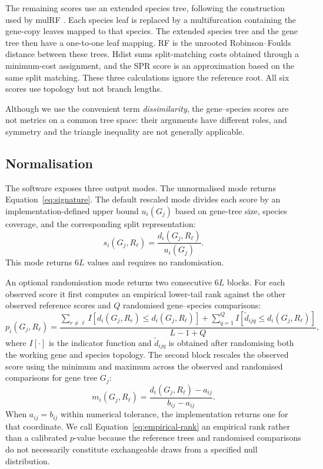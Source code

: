 The remaining scores use an extended species tree, following the construction used by mulRF
\citep{Chaudhary2015MulRF}. Each species leaf is replaced by a multifurcation containing the gene-copy leaves mapped to
that species. The extended species tree and the gene tree then have a one-to-one leaf mapping. RF is the unrooted
Robinson--Foulds distance between these trees. Hdist sums split-matching costs obtained through a minimum-cost assignment,
and the SPR score is an approximation based on the same split matching. These three calculations ignore the reference
root. All six scores use topology but not branch lengths.

Although we use the convenient term \emph{dissimilarity}, the gene--species scores are not metrics on a common tree
space: their arguments have different roles, and symmetry and the triangle inequality are not generally applicable.

\subsection{Normalisation}

The software exposes three output modes. The unnormalised mode returns Equation~\ref{eq:signature}. The default rescaled
mode divides each score by an implementation-defined upper bound $u_i(G_j)$ based on gene-tree size, species coverage,
and the corresponding split representation:
\begin{equation}
  s_i(G_j,R_\ell) = \frac{d_i(G_j,R_\ell)}{u_i(G_j)}.
  \label{eq:theoretical-rescale}
\end{equation}
This mode returns $6L$ values and requires no randomisation.

An optional randomisation mode returns two consecutive $6L$ blocks. For each observed score it first computes an
empirical lower-tail rank against the other observed reference scores and $Q$ randomised gene--species comparisons:
\begin{equation}
 p_i(G_j,R_\ell) =
 \frac{
   \sum_{r\ne\ell} I\!\left[d_i(G_j,R_r)\le d_i(G_j,R_\ell)\right]
   + \sum_{q=1}^{Q} I\!\left[\widetilde d_{ijq}\le d_i(G_j,R_\ell)\right]
 }{L-1+Q},
 \label{eq:empirical-rank}
\end{equation}
where $I[\cdot]$ is the indicator function and $\widetilde d_{ijq}$ is obtained after randomising both the working gene
and species topology. The second block rescales the observed score using the minimum and maximum across the observed and
randomised comparisons for gene tree $G_j$:
\begin{equation}
 m_i(G_j,R_\ell) =
 \frac{d_i(G_j,R_\ell)-a_{ij}}{b_{ij}-a_{ij}}.
 \label{eq:empirical-rescale}
\end{equation}
When $a_{ij}=b_{ij}$ within numerical tolerance, the implementation returns one for that coordinate. We call
Equation~\ref{eq:empirical-rank} an empirical rank rather than a calibrated $p$-value because the reference trees and
randomised comparisons do not necessarily constitute exchangeable draws from a specified null distribution.

